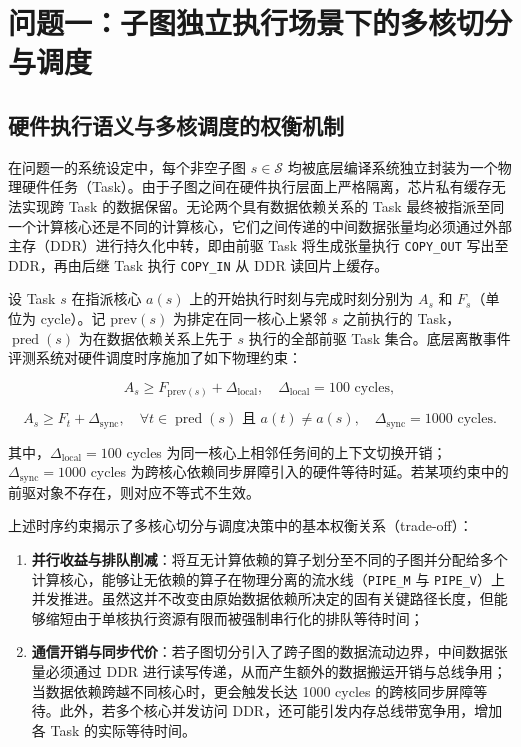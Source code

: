 \documentclass[anonymous,withtoc]{gmcm2026}
\providecommand{\tightlist}{\setlength{\itemsep}{0pt}\setlength{\parskip}{0pt}}
\begin{document}
\section{问题一：子图独立执行场景下的多核切分与调度}

\subsection{硬件执行语义与多核调度的权衡机制}

在问题一的系统设定中，每个非空子图 \(s \in \mathcal{S}\) 均被底层编译系统独立封装为一个物理硬件任务（Task）。由于子图之间在硬件执行层面上严格隔离，芯片私有缓存无法实现跨 Task 的数据保留。无论两个具有数据依赖关系的 Task 最终被指派至同一个计算核心还是不同的计算核心，它们之间传递的中间数据张量均必须通过外部主存（DDR）进行持久化中转，即由前驱 Task 将生成张量执行 \texttt{COPY\_OUT} 写出至 DDR，再由后继 Task 执行 \texttt{COPY\_IN} 从 DDR 读回片上缓存。

设 Task \(s\) 在指派核心 \(a(s)\) 上的开始执行时刻与完成时刻分别为 \(A_s\) 和 \(F_s\)（单位为 cycle）。记 \(\mathrm{prev}(s)\) 为排定在同一核心上紧邻 \(s\) 之前执行的 Task，\(\operatorname{pred}(s)\) 为在数据依赖关系上先于 \(s\) 执行的全部前驱 Task 集合。底层离散事件评测系统对硬件调度时序施加了如下物理约束：

\begin{equation}
A_s \ge F_{\mathrm{prev}(s)} + \Delta_{\mathrm{local}}, \quad \Delta_{\mathrm{local}} = 100 \text{ cycles},
\end{equation}

\begin{equation}
A_s \ge F_t + \Delta_{\mathrm{sync}}, \quad \forall t \in \operatorname{pred}(s) \text{ 且 } a(t) \ne a(s), \quad \Delta_{\mathrm{sync}} = 1000 \text{ cycles}.
\end{equation}

其中，\(\Delta_{\mathrm{local}} = 100\) cycles 为同一核心上相邻任务间的上下文切换开销；\(\Delta_{\mathrm{sync}} = 1000\) cycles 为跨核心依赖同步屏障引入的硬件等待时延。若某项约束中的前驱对象不存在，则对应不等式不生效。

上述时序约束揭示了多核心切分与调度决策中的基本权衡关系（trade-off）：

\begin{enumerate}
\def\labelenumi{\arabic{enumi}.}
\tightlist
\item
  \textbf{并行收益与排队削减}：将互无计算依赖的算子划分至不同的子图并分配给多个计算核心，能够让无依赖的算子在物理分离的流水线（\texttt{PIPE\_M} 与 \texttt{PIPE\_V}）上并发推进。虽然这并不改变由原始数据依赖所决定的固有关键路径长度，但能够缩短由于单核执行资源有限而被强制串行化的排队等待时间；
\item
  \textbf{通信开销与同步代价}：若子图切分引入了跨子图的数据流动边界，中间数据张量必须通过 DDR 进行读写传递，从而产生额外的数据搬运开销与总线争用；当数据依赖跨越不同核心时，更会触发长达 1000 cycles 的跨核同步屏障等待。此外，若多个核心并发访问 DDR，还可能引发内存总线带宽争用，增加各 Task 的实际等待时间。
\end{enumerate}
\end{document}
